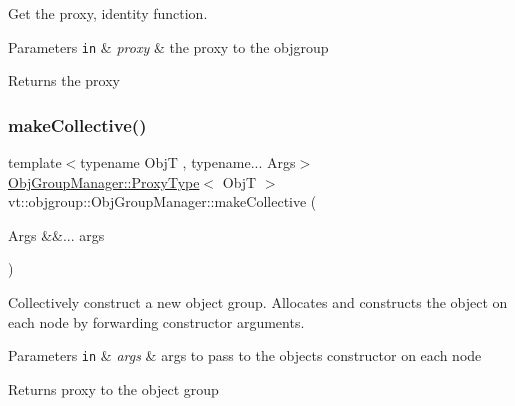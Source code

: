 Get the proxy, identity function. 


\begin{DoxyParams}[1]{Parameters}
\mbox{\tt in}  & {\em proxy} & the proxy to the objgroup\\
\hline
\end{DoxyParams}
\begin{DoxyReturn}{Returns}
the proxy 
\end{DoxyReturn}
\mbox{\label{structvt_1_1objgroup_1_1_obj_group_manager_a651c44a47c6bcdc9f1b6c9e857fa03f2}} 
\subsubsection{\texorpdfstring{make\+Collective()}{makeCollective()}\hspace{0.1cm}{\footnotesize\ttfamily [1/5]}}
{\footnotesize\ttfamily template$<$typename ObjT , typename... Args$>$ \\
\hyperlink{structvt_1_1objgroup_1_1_obj_group_manager_aea65eef52f240a52210132eef5ce591f}{Obj\+Group\+Manager\+::\+Proxy\+Type}$<$ ObjT $>$ vt\+::objgroup\+::\+Obj\+Group\+Manager\+::make\+Collective (\begin{DoxyParamCaption}\item[{Args \&\&...}]{args }\end{DoxyParamCaption})}



Collectively construct a new object group. Allocates and constructs the object on each node by forwarding constructor arguments. 


\begin{DoxyParams}[1]{Parameters}
\mbox{\tt in}  & {\em args} & args to pass to the object\textquotesingle{}s constructor on each node\\
\hline
\end{DoxyParams}
\begin{DoxyReturn}{Returns}
proxy to the object group 
\end{DoxyReturn}
\mbox{\label{structvt_1_1objgroup_1_1_obj_group_manager_ac1c2489611d2064b89b65b90059b2c4b}} 
